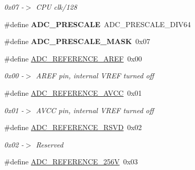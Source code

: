 \begin{CompactItemize}
\begin{CompactList}\small\item\em 0x07 -$>$ CPU clk/128 \item\end{CompactList}\item 
\hypertarget{group__a2d_g624110d24f42aac3b062f18495e04b51}{
\#define \textbf{ADC\_\-PRESCALE}~ADC\_\-PRESCALE\_\-DIV64}
\label{group__a2d_g624110d24f42aac3b062f18495e04b51}

\item 
\hypertarget{group__a2d_g97010ca07f7fab62f9fb4b4c404e6a90}{
\#define \textbf{ADC\_\-PRESCALE\_\-MASK}~0x07}
\label{group__a2d_g97010ca07f7fab62f9fb4b4c404e6a90}

\item 
\hypertarget{group__a2d_g69a5e4e3dcfeec25908050a0d328788f}{
\#define \hyperlink{group__a2d_g69a5e4e3dcfeec25908050a0d328788f}{ADC\_\-REFERENCE\_\-AREF}~0x00}
\label{group__a2d_g69a5e4e3dcfeec25908050a0d328788f}

\begin{CompactList}\small\item\em 0x00 -$>$ AREF pin, internal VREF turned off \item\end{CompactList}\item 
\hypertarget{group__a2d_g9697b28b449eee80f6f6bd31c29eaa48}{
\#define \hyperlink{group__a2d_g9697b28b449eee80f6f6bd31c29eaa48}{ADC\_\-REFERENCE\_\-AVCC}~0x01}
\label{group__a2d_g9697b28b449eee80f6f6bd31c29eaa48}

\begin{CompactList}\small\item\em 0x01 -$>$ AVCC pin, internal VREF turned off \item\end{CompactList}\item 
\hypertarget{group__a2d_gac3a75f24755af19f114e475a4d6a074}{
\#define \hyperlink{group__a2d_gac3a75f24755af19f114e475a4d6a074}{ADC\_\-REFERENCE\_\-RSVD}~0x02}
\label{group__a2d_gac3a75f24755af19f114e475a4d6a074}

\begin{CompactList}\small\item\em 0x02 -$>$ Reserved \item\end{CompactList}\item 
\hypertarget{group__a2d_g51f3cc56fa25dc1a0ccf5b35a6b242bf}{
\#define \hyperlink{group__a2d_g51f3cc56fa25dc1a0ccf5b35a6b242bf}{ADC\_\-REFERENCE\_\-256V}~0x03}
\label{group__a2d_g51f3cc56fa25dc1a0ccf5b35a6b242bf}


\end{CompactItemize}
